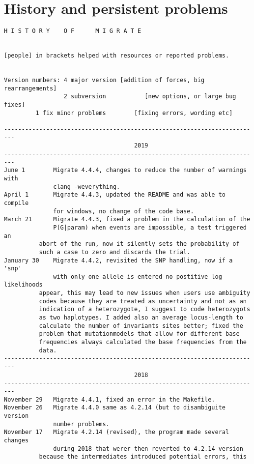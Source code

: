 \chapter{History and persistent problems}
\begin{small}
\begin{verbatim}
H I S T O R Y    O F      M I G R A T E 


[people] in brackets helped with resources or reported problems.


Version numbers: 4 major version [addition of forces, big rearrangements] 
                 2 subversion           [new options, or large bug fixes]
		 1 fix minor problems        [fixing errors, wording etc]  

-------------------------------------------------------------------------
                                     2019
-------------------------------------------------------------------------
June 1        Migrate 4.4.4, changes to reduce the number of warnings with
              clang -weverything. 
April 1       Migrate 4.4.3, updated the README and was able to compile
              for windows, no change of the code base.
March 21      Migrate 4.4.3, fixed a problem in the calculation of the
              P(G|param) when events are impossible, a test triggered an
	      abort of the run, now it silently sets the probability of
	      such a case to zero and discards the trial.
January 30    Migrate 4.4.2, revisited the SNP handling, now if a 'snp'
              with only one allele is entered no postitive log likelihoods
	      appear, this may lead to new issues when users use ambiguity
	      codes because they are treated as uncertainty and not as an
	      indication of a heterozygote, I suggest to code heterozygots
	      as two haplotypes. I added also an average locus-length to
	      calculate the number of invariants sites better; fixed the
	      problem that mutationmodels that allow for different base
	      frequencies always calculated the base frequencies from the
	      data.
-------------------------------------------------------------------------
                                     2018
-------------------------------------------------------------------------
November 29   Migrate 4.4.1, fixed an error in the Makefile.
November 26   Migrate 4.4.0 same as 4.2.14 (but to disambiguite version
              number problems.
November 17   Migrate 4.2.14 (revised), the program made several changes
              during 2018 that werer then reverted to 4.2.14 version
	      because the intermediates introduced potential errors, this

\end{verbatim}
\end{small}
